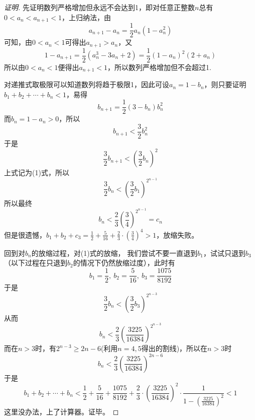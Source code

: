 \begin{proof}[证明]
  先证明数列严格增加但永远不会达到1，即对任意正整数$n$总有$0<a_n<a_{n+1}<1$，上归纳法，由
\[ a_{n+1}-a_n=\frac{1}{2}a_n(1-a_n^2) \]
可知，由$0<a_n<1$可得出$a_{n+1}>a_n$，又
\[ 1-a_{n+1}=\frac{1}{2}(a_n^3-3a_n+2)=\frac{1}{2}(1-a_n)^2(2+a_n) \]
所以由$0<a_n<1$便得出$a_{n+1}<1$，所以数列严格增加但不会超过1.

对递推式取极限可以知道数列将趋于极限1，因此可设$a_n=1-b_n$，则只要证明$b_1+b_2+\cdots+b_n<1$，易得
\[ b_{n+1}=\frac{1}{2}(3-b_n)b_n^2 \]
而$b_n=1-a_n >0$，所以
\[ b_{n+1}<\frac{3}{2}b_n^2 \]
于是
\[ \frac{3}{2}b_{n+1} < \left( \frac{3}{2}b_n \right)^2 \]
上式记为(1)式，所以
\[ \frac{3}{2}b_n < \left( \frac{3}{2}b_1 \right)^{2^{n-1}} \]
所以最终
\[ b_n<\frac{2}{3} \left( \frac{3}{4} \right)^{2^{n-1}} = c_n  \]
但是很遗憾，$b_1+b_2+c_3=\frac{1}{2}+\frac{5}{16}+\frac{2}{3}\cdot\left( \frac{3}{4} \right)^4>1$，放缩失败。

回到对$b_n$的放缩过程，对(1)式的放缩， 我们尝试不要一直退到$b_1$，试试只退到$b_3$（以下过程在只退到$b_2$的情况下仍然放缩过度），此时有
\[ b_1=\frac{1}{2}, \  b_2=\frac{5}{16}, \  b_3=\frac{1075}{8192} \]
于是
\[ \frac{3}{2}b_n < \left( \frac{3}{2}b_3 \right)^{2^{n-3}} \]
从而
\[ b_n<\frac{2}{3} \left( \frac{3225}{16384} \right)^{2^{n-3}}  \]
而在$n>3$时，有$2^{n-3}\geqslant 2n-6$(利用$n=4,5$得出的割线)，所以在$n>3$时
\[ b_n<\frac{2}{3} \left( \frac{3225}{16384} \right)^{2n-6} \] 
于是
\[ b_1+b_2+\cdots+b_n <  \frac{1}{2} + \frac{5}{16} + \frac{1075}{8192} + \frac{2}{3} \cdot \left( \frac{3225}{16384} \right)^2 \cdot \frac{1}{1-\left( \frac{3225}{16384} \right)^2} < 1 \]
这里没办法，上了计算器。证毕。
\end{proof}


